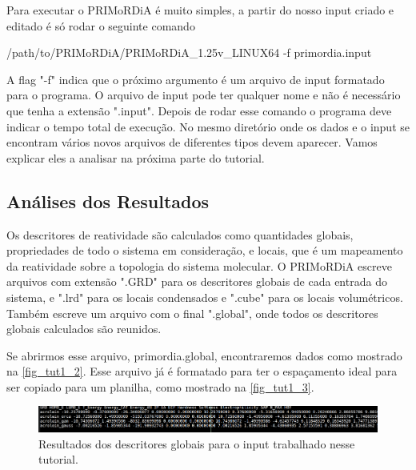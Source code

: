 \documentclass[a4paper,11pt]{refart}
\begin{document}
Para executar o PRIMoRDiA é muito simples, a partir do nosso input criado e editado é só rodar o seguinte comando

\hspace*{-\leftmarginwidth}
\begin{minipage}{\fullwidth}
\begin{commandshell}/path/to/PRIMoRDiA/PRIMoRDiA_1.25v_LINUX64 -f primordia.input\end{commandshell}
\end{minipage}

A flag "-f" indica que o próximo argumento é um arquivo de input formatado para o programa. O arquivo de input pode ter qualquer nome e não é necessário que tenha a extensão ".input". Depois de rodar esse comando o programa deve indicar o tempo total de execução. No mesmo diretório onde os dados e o input se encontram vários novos arquivos de diferentes tipos devem aparecer. Vamos explicar eles a analisar na próxima parte do tutorial.


\subsection{Análises dos Resultados}

Os descritores de reatividade são calculados como quantidades globais, propriedades de todo o sistema em consideração, e locais, que é um mapeamento da reatividade sobre a topologia do sistema molecular. O PRIMoRDiA escreve arquivos com extensão ".GRD" para os descritores globais de cada entrada do sistema, e ".lrd" para os locais condensados e ".cube" para os locais volumétricos. Também escreve um arquivo com o final ".global", onde todos os descritores globais calculados são reunidos.

Se abrirmos esse arquivo, primordia.global, encontraremos dados como mostrado na \autoref{fig_tut1_2}. Esse arquivo já é formatado para ter o espaçamento ideal para ser copiado para um planilha, como mostrado na \autoref{fig_tut1_3}.


\hspace*{-1.2\leftmarginwidth}
\begin{minipage}{\fullwidth}
	\begin{figure}[H]
		\begin{center}
			\includegraphics[width=7in]{images/img3}
			\caption{Resultados dos descritores globais para o input trabalhado nesse tutorial.}
			\label{fig_tut1_2}
		\end{center}
	\end{figure}
\end{minipage}	
\end{document}
